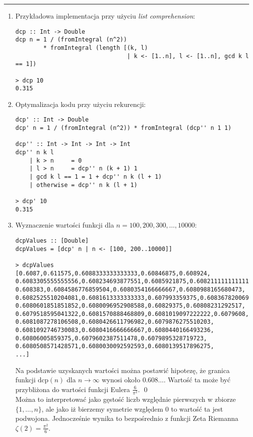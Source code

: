 \documentclass[11pt,a4paper]{article}
\begin{document}
\bigskip
\hrule
\bigskip

\begin{enumerate}
    \item Przykładowa implementacja przy użyciu \textit{list comprehension}:
        \begin{Verbatim}[frame=single]
dcp :: Int -> Double
dcp n = 1 / (fromIntegral (n^2))
        * fromIntegral (length [(k, l)
                                | k <- [1..n], l <- [1..n], gcd k l == 1])

> dcp 10
0.315
        \end{Verbatim}
    \item Optymalizacja kodu przy użyciu rekurencji:
        \begin{Verbatim}[frame=single]
dcp' :: Int -> Double
dcp' n = 1 / (fromIntegral (n^2)) * fromIntegral (dcp'' n 1 1)

dcp'' :: Int -> Int -> Int -> Int
dcp'' n k l
    | k > n     = 0
    | l > n     = dcp'' n (k + 1) 1
    | gcd k l == 1 = 1 + dcp'' n k (l + 1)
    | otherwise = dcp'' n k (l + 1)

> dcp' 10
0.315
        \end{Verbatim}
    \item Wyznaczenie wartości funkcji dla \(n = 100, 200, 300, \dots, 10000\):
        \begin{Verbatim}[frame=single]
dcpValues :: [Double]
dcpValues = [dcp' n | n <- [100, 200..10000]]

> dcpValues
[0.6087,0.611575,0.6088333333333333,0.60846875,0.608924,
0.6083305555555556,0.608234693877551,0.6085921875,0.6082111111111111,
0.608383,0.6084586776859504,0.6080354166666667,0.6080988165680473,
0.6082525510204081,0.6081613333333333,0.607993359375,0.6083678200692042,
0.6080601851851852,0.6080096952908588,0.60829375,0.60808231292517,
0.6079518595041322,0.6081570888468809,0.6081019097222222,0.6079608,
0.6081087278106508,0.6080426611796982,0.6079876275510203,
0.6081092746730083,0.6080416666666667,0.6080440166493236,
0.60806005859375,0.6079602387511478,0.6079895328719723,
0.6080508571428571,0.6080030092592593,0.6080139517896275,
...]
        \end{Verbatim}
        Na podstawie uzyskanych wartości można postawić hipotezę, że granica funkcji \(\text{dcp}(n)\) dla \(n \to \infty\) wynosi około $0.608 \dots$. Wartość ta może być przybliżona do wartości funkcji Eulera \(\frac{6}{\pi^2}\). \qed \\
        Można to interpretować jako gęstość liczb względnie pierwszych w zbiorze \(\{1, \dots, n\}\), ale jako iż bierzemy symetrie względem $0$ to wartość ta jest podwojona. Jednocześnie wynika to bezpośrednio z funkcji Zeta Riemanna $\zeta(2) = \frac{\pi^2}{6}$.
\end{enumerate}
\end{document}
